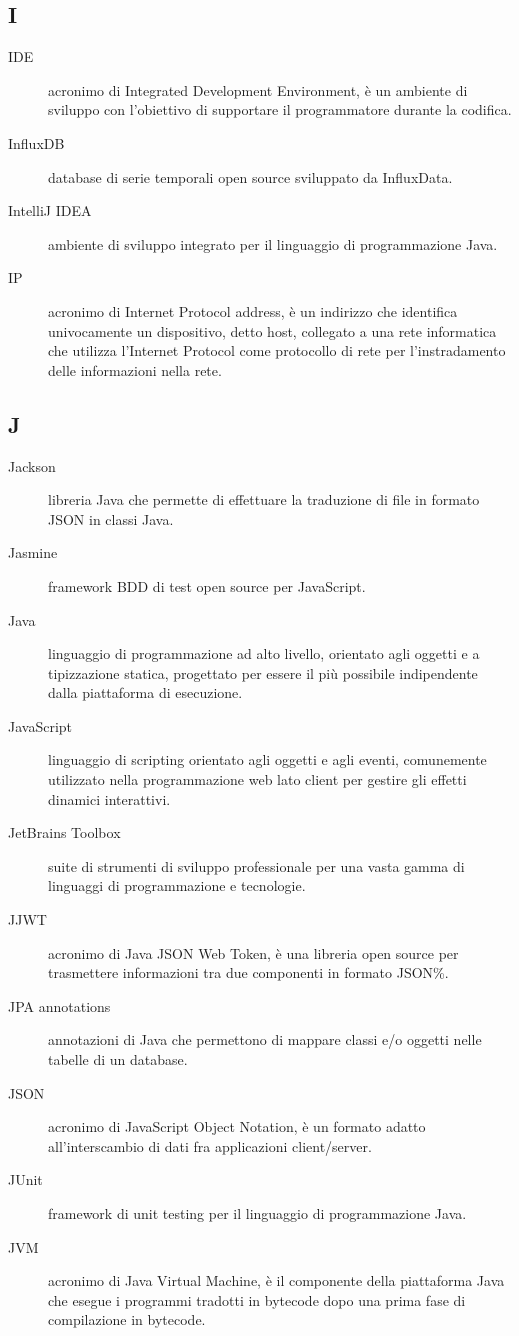 \documentclass[../manuale-manutentore.tex]{subfiles}
\begin{document}
\subsection{I}

\begin{description}
    \item[IDE] acronimo di Integrated Development Environment, è un ambiente di sviluppo con l'obiettivo di supportare il programmatore durante la codifica.
    \item[InfluxDB] database di serie temporali open source sviluppato da InfluxData.
    \item[IntelliJ IDEA] ambiente di sviluppo integrato per il linguaggio di programmazione Java.
    \item[IP] acronimo di Internet Protocol address, è un indirizzo che identifica univocamente un dispositivo, detto host, collegato a una rete informatica che utilizza l'Internet Protocol come protocollo di rete per l'instradamento delle informazioni nella rete.
\end{description}

\subsection{J}

\begin{description}
    \item[Jackson] libreria Java che permette di effettuare la traduzione di file in formato JSON in classi Java.
    \item[Jasmine] framework BDD di test open source per JavaScript.
    \item[Java] linguaggio di programmazione ad alto livello, orientato agli oggetti e a tipizzazione statica, progettato per essere il più possibile indipendente dalla piattaforma di esecuzione.
    \item[JavaScript] linguaggio di scripting orientato agli oggetti e agli eventi, comunemente utilizzato nella programmazione web lato client per gestire gli effetti dinamici interattivi.
    \item[JetBrains Toolbox] suite di strumenti di sviluppo professionale per una vasta gamma di linguaggi di programmazione e tecnologie.
    \item[JJWT] acronimo di Java JSON Web Token, è una libreria open source per trasmettere informazioni tra due componenti in formato JSON\%.
    \item[JPA annotations] annotazioni di Java che permettono di mappare classi e/o oggetti nelle tabelle di un database.
    \item[JSON] acronimo di JavaScript Object Notation, è un formato adatto all'interscambio di dati fra applicazioni client/server.
    \item[JUnit] framework di unit testing per il linguaggio di programmazione Java.
    \item[JVM] acronimo di Java Virtual Machine, è il componente della piattaforma Java che esegue i programmi tradotti in bytecode dopo una prima fase di compilazione in bytecode.
\end{description}
\end{document}
